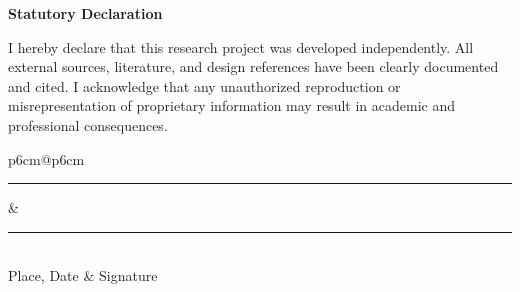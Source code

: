 \clearpage
\pagestyle{empty}


\begin{center}
	\LARGE\bfseries Statutory Declaration
\end{center}

\vspace{4em}

\noindent
I hereby declare that this research project was developed independently. All external sources, literature, and design references have been clearly documented and cited. I acknowledge that any unauthorized reproduction or misrepresentation of proprietary information may result in academic and professional consequences.

\vspace{6em}

\begin{center}
	\begin{tabular}{p{6cm}@{\hspace{3cm}}p{6cm}}
		\rule{\linewidth}{0.4pt} & \rule{\linewidth}{0.4pt} \\
		\centering Place, Date   & \centering Signature     \\
	\end{tabular}
\end{center}

